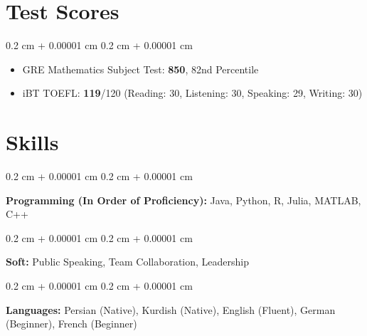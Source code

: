 \documentclass[10pt, letterpaper]{article}
\newenvironment{highlightsforbulletentries}{
    \begin{itemize}[
        topsep=0.05 cm,
        parsep=0.04 cm,
        partopsep=0pt,
        itemsep=0pt,
        leftmargin=10pt
    ]
}{
    \end{itemize}
} %
\newenvironment{onecolentry}{
    \begin{adjustwidth}{
        0.2 cm + 0.00001 cm
    }{
        0.2 cm + 0.00001 cm
    }
}{
    \end{adjustwidth}
} %
\newenvironment{twocolentry}[2][]{
    \onecolentry
    \def\secondColumn{#2}
    \setcolumnwidth{\fill, 4.5 cm}
    \begin{paracol}{2}
}{
    \switchcolumn \raggedleft \secondColumn
    \end{paracol}
    \endonecolentry
} %
\begin{document}
            
            

	\section{Test Scores}
	\begin{onecolentry}
		\begin{highlightsforbulletentries}

        \item {GRE Mathematics Subject Test:} \textbf{850}, 82nd Percentile 

        \item {iBT TOEFL: } \textbf{119}/120 (Reading: 30, Listening: 30, Speaking: 29, Writing: 30)

        \end{highlightsforbulletentries}
    \end{onecolentry}

        \vspace{0.2 cm}
    
    \section{Skills}
        
        \begin{onecolentry}
            \textbf{Programming (In Order of Proficiency):} Java, Python, R, Julia, MATLAB, C++
        \end{onecolentry}

        \vspace{0.2 cm}

        \begin{onecolentry}
            \textbf{Soft:} Public Speaking, Team Collaboration, Leadership
        \end{onecolentry}
        
        \vspace{0.2 cm}

        \begin{onecolentry}
            \textbf{Languages:} Persian (Native), Kurdish (Native), English (Fluent), German (Beginner), French (Beginner)
        \end{onecolentry}
        
\end{document}
